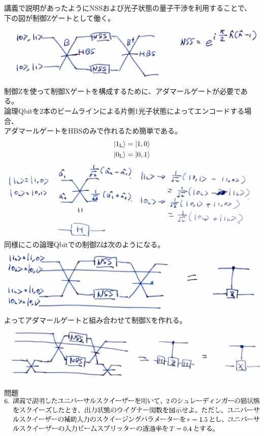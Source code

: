 \documentclass{jsarticle}
\newcommand{\mr}[1]{\mathrm{#1}}
\begin{document}
講義で説明があったようにNSSおよび光子状態の量子干渉を利用することで、\\
下の図が制御Zゲートとして働く。\\
\includegraphics[width=0.9\linewidth]{./graphics/nss.pdf}\\
制御Zを使って制御Xゲートを構成するために、アダマールゲートが必要である。\\
論理Qbitを2本のビームラインによる片側1光子状態によってエンコードする場合、\\
アダマールゲートをHBSのみで作れるため簡単である。
\begin{gather*}
	\ket{1_\mr{L}} = \ket{1,0}\\
	\ket{0_\mr{L}} = \ket{0,1}
\end{gather*}
\includegraphics[width=0.9\linewidth]{./graphics/h.pdf}\\
同様にこの論理Qbitでの制御Zは次のようになる。\\
\includegraphics[width=0.9\linewidth]{./graphics/cz.pdf}\\
よってアダマールゲートと組み合わせて制御Xを作れる。\\
\includegraphics[width=0.9\linewidth]{./graphics/cx.pdf}\\

\begin{itembox}[l]{問題}
	\vspace*{-0mm}
	\centering
	\includegraphics[width=1\linewidth]{./graphics/6.pdf}
\end{itembox}




\end{document}
